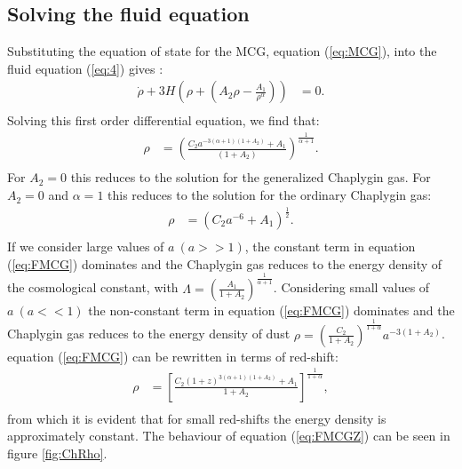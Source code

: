 \documentclass[a4paper, 11pt]{FSKH_623_Report}
\numberwithin{equation}{section}
\newcommand{\brac}[1]{\left(#1\right)}
\newcommand{\bracc}[1]{\left[#1\right]}
\begin{document}
\subsection*{Solving the fluid equation}
Substituting the equation of state for the MCG, equation (\ref{eq:MCG}), into the fluid equation (\ref{eq:4}) gives :
\begin{equation}\label{eq:FMCG0}
\begin{split}
\dot{\rho}+3H\brac{\rho+\brac{A_{2}\rho-\frac{A_{1}}{\rho^{\alpha}}}} &= 0. \\
\end{split}
\end{equation}
Solving this first order differential equation, we find that:
\begin{equation}\label{eq:FMCG}
\begin{split}
\rho&=\brac{\frac{C_{2}a^{-3\brac{\alpha+1}\brac{1+A_{2}}}+A_{1}}{\brac{1+A_{2}}}}^{\frac{1}{\alpha+1}}.\\ 
\end{split} 
\end{equation} 
For $A_{2}=0$ this reduces to the solution for the generalized Chaplygin gas. For $A_{2}=0$ and $\alpha=1$ this reduces to the solution for the ordinary Chaplygin gas:
\begin{equation}\label{eq:OCGRH}
\begin{split}
\rho&=\brac{C_{2}a^{-6}+A_{1}}^{\frac{1}{2}}.\\
\end{split}
\end{equation}
If we consider large values of $a\ \brac{a>>1}$, the constant term in equation (\ref{eq:FMCG}) dominates and the Chaplygin gas reduces to the energy density of the cosmological constant, with $\Lambda=\brac{\frac{A_{1}}{1+A_{2}}}^{\frac{1}{\alpha+1}}$. Considering small values of $a\ \brac{a<<1}$ the non-constant term in equation (\ref{eq:FMCG}) dominates and the Chaplygin gas reduces to the energy density of dust $\rho=\brac{\frac{C_{2}}{1+A_{2}}}^{\frac{1}{1+\alpha}}a^{-3(1+A_{2})}$. equation (\ref{eq:FMCG}) can be rewritten in terms of red-shift:
\begin{equation}\label{eq:FMCGZ}
\begin{split}
\rho  &= \bracc{\frac{C_{2}\brac{1+z}^{3\brac{\alpha+1}\brac{1+A_{2}}}+A_{1}}{1+A_{2}}}^{\frac{1}{1+\alpha}},         \\
\end{split}
\end{equation}
from which it is evident that for small red-shifts the energy density is approximately constant. The behaviour of equation (\ref{eq:FMCGZ}) can be seen in figure \ref{fig:ChRho}.
	
\end{document}
